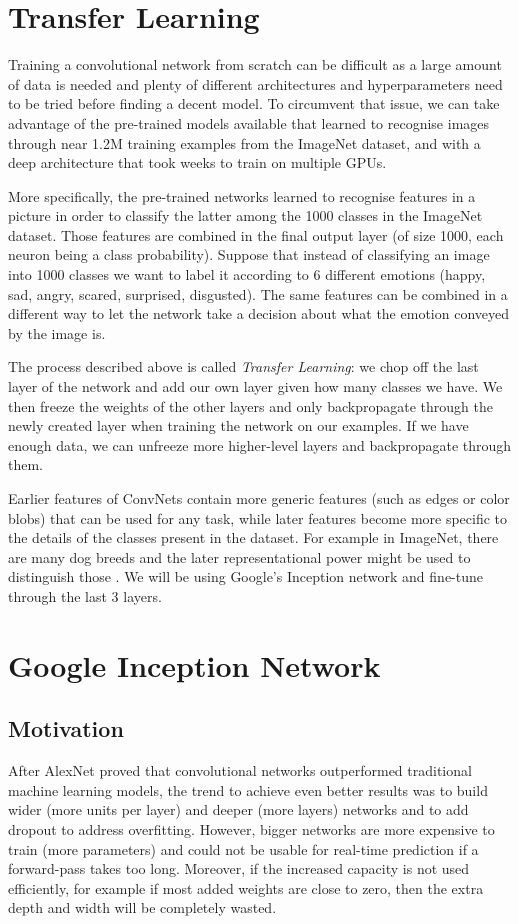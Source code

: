 \section{Transfer Learning}
Training a convolutional network from scratch can be difficult as a large amount of data is needed and plenty of different architectures and hyperparameters need to be tried before finding a decent model. To circumvent that issue, we can take advantage of the pre-trained models available that learned to recognise images through near 1.2M training examples from the ImageNet dataset, and with a deep architecture that took weeks to train on multiple GPUs.

More specifically, the pre-trained networks learned to recognise features in a picture in order to classify the latter among the 1000 classes in the ImageNet dataset. Those features are combined in the final output layer (of size 1000, each neuron being a class probability). Suppose that instead of classifying an image into 1000 classes we want to label it according to 6 different emotions (happy, sad, angry, scared, surprised, disgusted). The same features can be combined in a different way to let the network take a decision about what the emotion conveyed by the image is.

The process described above is called {\em Transfer Learning}: we chop off the last layer of the network and add our own layer given how many classes we have. We then freeze the weights of the other layers and only backpropagate through the newly created layer when training the network on our examples. If we have enough data, we can unfreeze more higher-level layers and backpropagate through them.

Earlier features of ConvNets contain more generic features (such as edges or color blobs) that can be used for any task, while later features become more specific to the details of the classes present in the dataset. For example in ImageNet, there are many dog breeds and the later representational power might be used to distinguish those \cite{transfer}. We will be using Google's Inception network and fine-tune through the last 3 layers.

\section{Google Inception Network}

\subsection{Motivation}
After AlexNet proved that convolutional networks outperformed traditional machine learning models, the trend to achieve even better results was to build wider (more units per layer) and deeper (more layers) networks and to add dropout to address overfitting. However, bigger networks are more expensive to train (more parameters) and could not be usable for real-time prediction if a forward-pass takes too long. Moreover, if the increased capacity is not used efficiently, for example if most added weights are close to zero, then the extra depth and width will be completely wasted.

